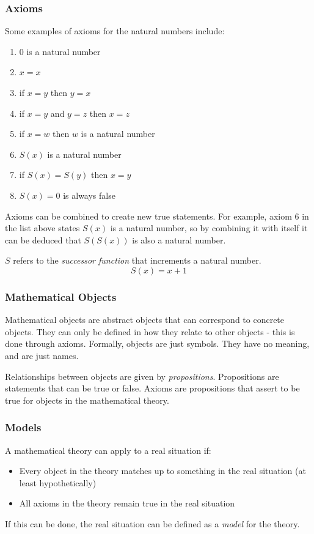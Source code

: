 \documentclass{article}
\begin{document}
\subsubsection{Axioms}
Some examples of axioms for the natural numbers include:
\begin{enumerate}
    \item 0 is a natural number
    \item \(x = x\)
    \item if \(x = y\) then \(y = x\)
    \item if \(x = y\) and \(y = z\) then \(x = z\)
    \item if \(x = w\) then \(w\) is a natural number
    \item \(S(x)\) is a natural number
    \item if \(S(x) = S(y)\) then \(x = y\)
    \item \(S(x) = 0\) is always false
\end{enumerate}
Axioms can be combined to create new true statements.
For example, axiom 6 in the list above states \(S(x)\) is a natural number,
so by combining it with itself it can be deduced that \(S(S(x))\) is also a natural number.
\begin{tcolorbox}[title=Note]
    \begin{center}
        \(S\) refers to the \emph{successor function} that increments a natural number.
        \[S(x) = x + 1\]
    \end{center}
\end{tcolorbox}
%
\subsubsection{Mathematical Objects}
Mathematical objects are abstract objects that can correspond to concrete objects.
They can only be defined in how they relate to other objects - this is done through axioms.
Formally, objects are just symbols. They have no meaning, and are just names.

Relationships between objects are given by \emph{propositions}.
Propositions are statements that can be true or false.
Axioms are propositions that assert to be true for objects in the mathematical theory.
%
\subsubsection{Models}
A mathematical theory can apply to a real situation if:
\begin{itemize}
    \item Every object in the theory matches up to something in the real situation (at least hypothetically)
    \item All axioms in the theory remain true in the real situation
\end{itemize}
If this can be done, the real situation can be defined as a \emph{model} for the theory.
\end{document}
